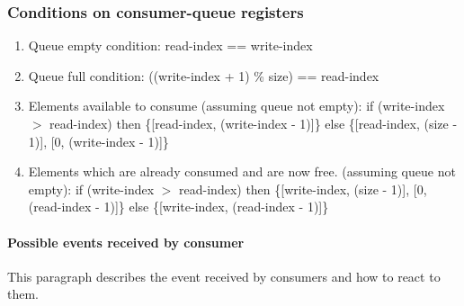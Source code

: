 \documentclass[a4paper,twoside]{report} %
\begin{document}
\subsubsection{Conditions on consumer-queue registers}

\begin{enumerate} 
  \item Queue empty condition: read-index == write-index
  \item Queue full condition: ((write-index + 1) \% size) == read-index 
  \item Elements available to consume \newline
  (assuming queue not empty):\newline
  if (write-index $>$ read-index) \newline
    then \{[read-index, (write-index - 1)]\} \newline
    else \{[read-index, (size - 1)], [0, (write-index - 1)]\}  \newline
  \item Elements which are already consumed and are now free.  \newline
  (assuming queue not empty):  \newline
  if (write-index $>$ read-index) \newline
    then \{[write-index, (size - 1)], [0, (read-index - 1)]\} \newline
    else \{[write-index, (read-index - 1)]\} \newline
\end{enumerate} 

\paragraph{Possible events received by consumer}
This paragraph describes the event received by consumers and how
to react to them.
\end{document}
